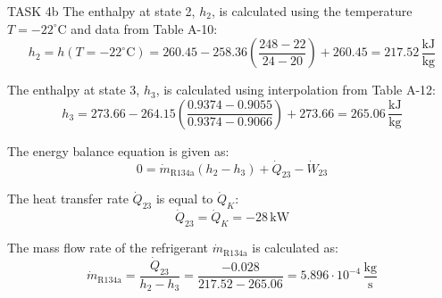 TASK 4b  
The enthalpy at state 2, \( h_2 \), is calculated using the temperature \( T = -22^\circ\text{C} \) and data from Table A-10:  
\[
h_2 = h(T = -22^\circ\text{C}) = 260.45 - 258.36 \left(\frac{248 - 22}{24 - 20}\right) + 260.45 = 217.52 \, \frac{\text{kJ}}{\text{kg}}
\]

The enthalpy at state 3, \( h_3 \), is calculated using interpolation from Table A-12:  
\[
h_3 = 273.66 - 264.15 \left(\frac{0.9374 - 0.9055}{0.9374 - 0.9066}\right) + 273.66 = 265.06 \, \frac{\text{kJ}}{\text{kg}}
\]

The energy balance equation is given as:  
\[
0 = \dot{m}_{\text{R134a}} (h_2 - h_3) + \dot{Q}_{23} - \dot{W}_{23}
\]

The heat transfer rate \( \dot{Q}_{23} \) is equal to \( \dot{Q}_K \):  
\[
\dot{Q}_{23} = \dot{Q}_K = -28 \, \text{kW}
\]

The mass flow rate of the refrigerant \( \dot{m}_{\text{R134a}} \) is calculated as:  
\[
\dot{m}_{\text{R134a}} = \frac{\dot{Q}_{23}}{h_2 - h_3} = \frac{-0.028}{217.52 - 265.06} = 5.896 \cdot 10^{-4} \, \frac{\text{kg}}{\text{s}}
\]